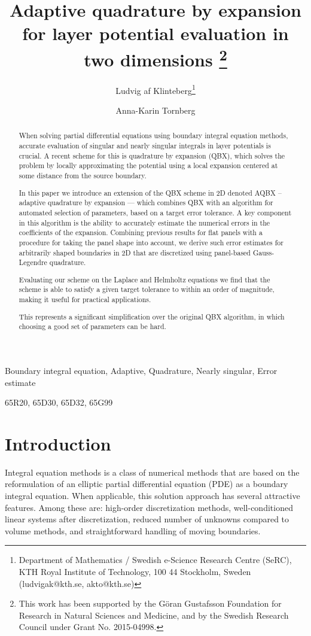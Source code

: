 \documentclass[hidelinks]{siamart1116}
\title{Adaptive quadrature by expansion for layer potential evaluation
  in two dimensions \thanks{This work has been supported by the
    G\"oran Gustafsson Foundation for Research in Natural Sciences and
    Medicine, and by the Swedish Research Council under Grant
    No. 2015-04998.}}
\author{Ludvig af Klinteberg\thanks{Department of Mathematics /
    Swedish e-Science Research Centre (SeRC), KTH Royal Institute of
    Technology, 100 44 Stockholm, Sweden ({}{ludvigak@kth.se},
    {}{akto@kth.se})} \and Anna-Karin Tornberg\footnotemark[2]}
\begin{document}
\maketitle

\begin{abstract}
  
  When solving partial differential equations using boundary integral
  equation methods, accurate evaluation of singular and nearly
  singular integrals in layer potentials is crucial. A recent scheme
  for this is quadrature by expansion (QBX), which solves the problem
  by locally approximating the potential using a local expansion
  centered at some distance from the source boundary.
  
  In this paper we introduce an extension of the QBX scheme in 2D
  denoted AQBX -- adaptive quadrature by expansion --- which combines
  QBX with an algorithm for automated selection of parameters, based
  on a target error tolerance. A key component in this algorithm is
  the ability to accurately estimate the numerical errors in the
  coefficients of the expansion. Combining previous results for flat
  panels with a procedure for taking the panel shape into account, we
  derive such error estimates for arbitrarily shaped boundaries in 2D that
  are discretized using panel-based Gauss-Legendre quadrature.
  
  Evaluating our scheme on the Laplace and Helmholtz equations we find
  that the scheme is able to satisfy a given target tolerance to
  within an order of magnitude, making it useful for practical
  applications.
  
  This represents a significant simplification over the original QBX
  algorithm, in which choosing a good set of parameters can be hard.
\end{abstract}

\begin{keywords}
  Boundary integral equation, Adaptive, Quadrature, Nearly singular,
  Error estimate
\end{keywords}

\begin{AMS}
  65R20, 65D30, 65D32, 65G99
\end{AMS}

\section{Introduction}

Integral equation methods is a class of numerical methods that are
based on the reformulation of an elliptic partial differential
equation (PDE) as a boundary integral equation. When applicable, this
solution approach has several attractive features. Among these are:
high-order discretization methods, well-conditioned linear systems
after discretization, reduced number of unknowns compared to volume
methods, and straightforward handling of moving boundaries.
\end{document}
